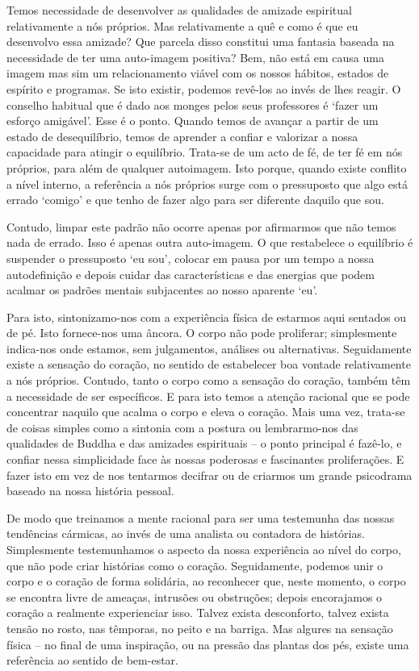 Temos necessidade de desenvolver as qualidades de amizade espiritual relativamente a nós próprios. Mas relativamente a quê e como é que eu desenvolvo essa amizade? Que parcela disso constitui uma fantasia baseada na necessidade de ter uma auto-imagem positiva? Bem, não está em causa uma imagem mas sim um relacionamento viável com os nossos hábitos, estados de espírito e programas. Se isto existir, podemos revê-los ao invés de lhes reagir. O conselho habitual que é dado aos monges pelos seus professores é `fazer um esforço amigável'. Esse é o ponto. Quando temos de avançar a partir de um estado de desequilíbrio, temos de aprender a confiar e valorizar a nossa capacidade para atingir o equilíbrio. Trata-se de um acto de fé, de ter fé em nós próprios, para além de qualquer autoimagem. Isto porque, quando existe conflito a nível interno, a referência a nós próprios surge com o pressuposto que algo está errado `comigo' e que tenho de fazer algo para ser diferente daquilo que sou.

Contudo, limpar este padrão não ocorre apenas por afirmarmos que não temos nada de errado. Isso é apenas outra auto-imagem. O que restabelece o equilíbrio é suspender o pressuposto `eu sou', colocar em pausa por um tempo a nossa autodefinição e depois cuidar das características e das energias que podem acalmar os padrões mentais subjacentes ao nosso aparente `eu'.

Para isto, sintonizamo-nos com a experiência física de estarmos aqui sentados ou de pé. Isto fornece-nos uma âncora. O corpo não pode proliferar; simplesmente indica-nos onde estamos, sem julgamentos, análises ou alternativas. Seguidamente existe a sensação do coração, no sentido de estabelecer boa vontade relativamente a nós próprios. Contudo, tanto o corpo como a sensação do coração, também têm a necessidade de ser específicos. E para isto temos a atenção racional que se pode concentrar naquilo que acalma o corpo e eleva o coração. Mais uma vez, trata-se de coisas simples como a sintonia com a postura ou lembrarmo-nos das qualidades de Buddha e das amizades espirituais -- o ponto principal é fazê-lo, e confiar nessa simplicidade face às nossas poderosas e fascinantes proliferações. E fazer isto em vez de nos tentarmos decifrar ou de criarmos um grande psicodrama baseado na nossa história pessoal.

De modo que treinamos a mente racional para ser uma testemunha das nossas tendências cármicas, ao invés de uma analista ou contadora de histórias. Simplesmente testemunhamos o aspecto da nossa experiência ao nível do corpo, que não pode criar histórias como o coração. Seguidamente, podemos unir o corpo e o coração de forma solidária, ao reconhecer que, neste momento, o corpo se encontra livre de ameaças, intrusões ou obstruções; depois encorajamos o coração a realmente experienciar isso. Talvez exista desconforto, talvez exista tensão no rosto, nas têmporas, no peito e na barriga. Mas algures na sensação física -- no final de uma inspiração, ou na pressão das plantas dos pés, existe uma referência ao sentido de bem-estar.

